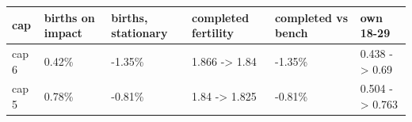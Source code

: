 \begingroup\small
\setlength{\tabcolsep}{3pt}
\renewcommand{\arraystretch}{1.04}
\begin{tabularx}{\linewidth}{XXXXXX}
\toprule
cap & births on impact & births, stationary & completed fertility & completed vs bench & own 18-29 \\
\midrule
cap 6 & 0.42\% & -1.35\% & 1.866 -\textgreater{} 1.84 & -1.35\% & 0.438 -\textgreater{} 0.69 \\
cap 5 & 0.78\% & -0.81\% & 1.84 -\textgreater{} 1.825 & -0.81\% & 0.504 -\textgreater{} 0.763 \\
\bottomrule
\end{tabularx}
\endgroup

